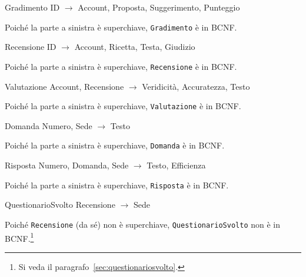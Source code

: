 \begin{samepage}
\begin{funcdep}{Gradimento}
    ID $\to$ Account, Proposta, Suggerimento, Punteggio
\end{funcdep}
Poiché la parte a sinistra è superchiave, {\tt Gradimento} è in BCNF.
\end{samepage}

\begin{samepage}
\begin{funcdep}{Recensione}
    ID $\to$ Account, Ricetta, Testa, Giudizio
\end{funcdep}
Poiché la parte a sinistra è superchiave, {\tt Recensione} è in BCNF.
\end{samepage}

\begin{samepage}
\begin{funcdep}{Valutazione}
    Account, Recensione $\to$ Veridicità, Accuratezza, Testo
\end{funcdep}
Poiché la parte a sinistra è superchiave, {\tt Valutazione} è in BCNF.
\end{samepage}

\begin{samepage}
\begin{funcdep}{Domanda}
    Numero, Sede $\to$ Testo
\end{funcdep}
Poiché la parte a sinistra è superchiave, {\tt Domanda} è in BCNF.
\end{samepage}

\begin{samepage}
\begin{funcdep}{Risposta}
    Numero, Domanda, Sede $\to$ Testo, Efficienza
\end{funcdep}
Poiché la parte a sinistra è superchiave, {\tt Risposta} è in BCNF.
\end{samepage}

\begin{samepage}
\begin{funcdep}{QuestionarioSvolto}
    Recensione $\to$ Sede
\end{funcdep}
Poiché {\tt Recensione} (da sé) non è superchiave, {\tt QuestionarioSvolto} non è in BCNF.\footnote{Si veda il paragrafo~\vref{sec:questionariosvolto}.}
\end{samepage}
